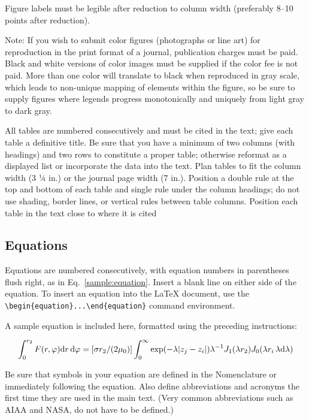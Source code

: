 \documentclass[journal]{new-aiaa}
\begin{document}
Figure labels must be legible after reduction to column width (preferably 8--10 points after reduction).

Note: If you wish to submit color figures (photographs or line art) for reproduction in the print format of a journal, publication charges must be paid. Black and white versions of color images must be supplied if the color fee is not paid. More than one color will translate to black when reproduced in gray scale, which leads to non-unique mapping of elements within the figure, so be sure to supply figures where legends progress monotonically and uniquely from light gray to dark gray.

All tables are numbered consecutively and must be cited in the text; give each table a definitive title. Be sure that you have a minimum of two columns (with headings) and two rows to constitute a proper table; otherwise reformat as a displayed list or incorporate the data into the text. Plan tables to fit the column width (3 ¼ in.) or the journal page width (7 in.). Position a double rule at the top and bottom of each table and single rule under the column headings; do not use shading, border lines, or vertical rules between table columns. Position each table in the text close to where it is cited


\subsection{Equations}
Equations are numbered consecutively, with equation numbers in parentheses flush right, as in Eq.~\eqref{sample:equation}. Insert a blank line on either side of the equation. To insert an equation into the \LaTeX{} document, use the \verb|\begin{equation}...\end{equation}| command environment.

A sample equation is included here, formatted using the preceding instructions:

\begin{equation}
\label{sample:equation}
\int^{r_2}_0 F(r,\varphi){\rm d}r\,{\rm d}\varphi = [\sigma r_2/(2\mu_0)]\int^{\infty}_0\exp(-\lambda|z_j-z_i|)\lambda^{-1}J_1 (\lambda r_2)J_0 (\lambda r_i\,\lambda {\rm d}\lambda)
\end{equation}

Be sure that symbols in your equation are defined in the Nomenclature or immediately following the equation. Also define abbreviations and acronyms the first time they are used in the main text. (Very common abbreviations such as AIAA and NASA, do not have to be defined.)
\end{document}
